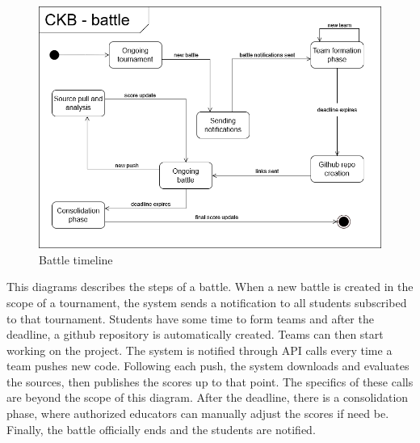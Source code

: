 \begin{figure}[H]
      \centering
      \includegraphics[scale=0.4]{src/state_diagrams/battle_uml.png}
      \caption{Battle timeline}
\end{figure} \vspace{1cm}
    This diagrams describes the steps of a battle. When a new battle is created in the scope of a tournament, the system sends a notification to all students subscribed to that tournament. Students have some time to form teams and after the deadline, a github repository is automatically created. Teams can then start working on the project. The system is notified through API calls every time a team pushes new code. Following each push, the system downloads and evaluates the sources, then publishes the scores up to that point. The specifics of these calls are beyond the scope of this diagram. After the deadline, there is a consolidation phase, where authorized educators can manually adjust the scores if need be. Finally, the battle officially ends and the students are notified.

